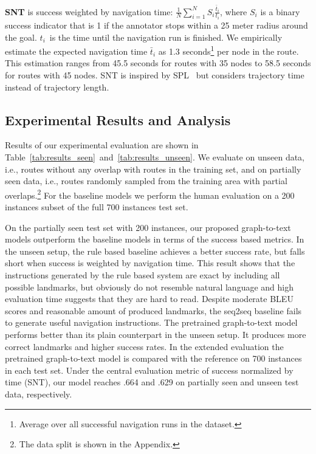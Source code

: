 \documentclass[11pt,a4paper]{article}
\begin{document}
\noindent\textbf{SNT} is success weighted by navigation time: $\frac{1}{N}\sum_{i=1}^{N}{S_i\frac{\bar{t}_i}{t_i}}$, where $S_i$ is a binary success indicator that is 1 if the annotator stops within a 25 meter radius around the goal. $t_i$~is the time until the navigation run is finished. We empirically estimate the expected navigation time $\bar{t}_i$ as 1.3 seconds\footnote{Average over all successful navigation runs in the dataset.} per node in the route. This estimation ranges from 45.5 seconds for routes with 35 nodes to 58.5 seconds for routes with 45 nodes. SNT is inspired by SPL~\citep{SPL} but considers trajectory time instead of trajectory length.

\subsection{Experimental Results and Analysis}

Results of our experimental evaluation are shown in Table~\ref{tab:results_seen}~and~\ref{tab:results_unseen}. We evaluate on unseen data, i.e., routes without any overlap with routes in the training set, and on partially seen data, i.e., routes randomly sampled from the training area with partial overlaps.\footnote{The data split is shown in the Appendix.} For the baseline models we perform the human evaluation on a 200 instances subset of the full 700 instances test set.

On the partially seen test set with 200 instances, our proposed graph-to-text models outperform the baseline models in terms of the success based metrics. In the unseen setup, the rule based baseline achieves a better success rate, but falls short when success is weighted by navigation time. This result shows that the instructions generated by the rule based system are exact by including all possible landmarks, but obviously do not resemble natural language and high evaluation time suggests that they are hard to read. Despite moderate BLEU scores and reasonable amount of produced landmarks, the seq2seq baseline fails to generate useful navigation instructions. The pretrained graph-to-text model performs better than its plain counterpart in the unseen setup. It produces more correct landmarks and higher success rates. In the extended evaluation the pretrained graph-to-text model is compared with the reference on 700 instances in each test set. Under the central evaluation metric of success normalized by time (SNT), our model reaches .664 and .629 on partially seen and unseen test data, respectively.
\end{document}
